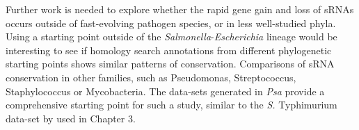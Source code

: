 Further work is needed to explore whether the rapid gene gain and loss of sRNAs occurs outside of fast-evolving pathogen species, or in less well-studied phyla. Using a starting point outside of the \textit{Salmonella}-\textit{Escherichia} lineage would be interesting to see if homology search annotations from different phylogenetic starting points shows similar patterns of conservation. Comparisons of sRNA conservation in other families, such as Pseudomonas, Streptococcus, Staphylococcus or Mycobacteria. The data-sets generated in \textit{Psa} provide a comprehensive starting point for such a study, similar to the \textit{S.} Typhimurium data-set by \citep{Kroger2013-pppg} used in Chapter 3. 




